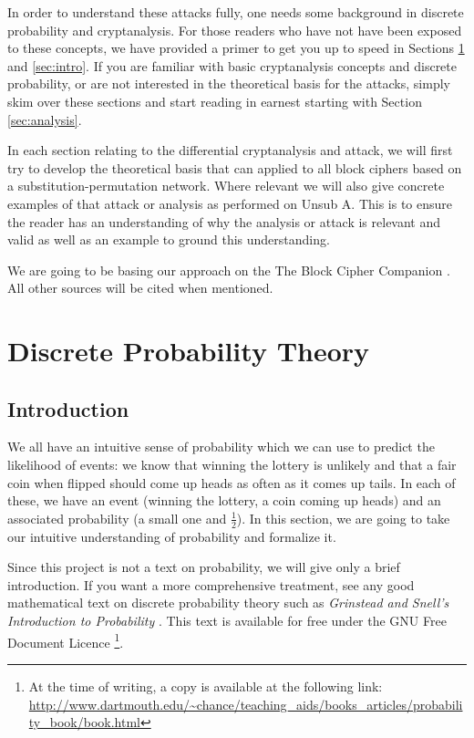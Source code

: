 \documentclass[12pt,a4paper]{article}
\begin{document}
In order to understand these attacks fully, one needs some background in
discrete probability and cryptanalysis. For those readers who have not have
been exposed to these concepts, we have provided a primer to get you up to
speed in Sections \ref{sec:probability} and \ref{sec:intro}. If you are familiar
with basic cryptanalysis concepts and discrete probability, or are not
interested in the theoretical basis for the attacks, simply skim over these
sections and start reading in earnest starting with Section \ref{sec:analysis}. 

In each section relating to the differential cryptanalysis and attack, we will
first try to develop the theoretical basis that can applied to all block
ciphers based on a substitution-permutation network. Where relevant we will
also give concrete examples of that attack or analysis as performed on Unsub A.
This is to ensure the reader has an understanding of why the analysis or attack
is relevant and valid as well as an example to ground this understanding. 

We are going to be basing our approach on the The Block Cipher Companion
\cite{BlockCipherCompanion}. All other sources will be cited when mentioned.

\newpage

\section{Discrete Probability Theory}
\label{sec:probability}
\subsection{Introduction}
We all have an intuitive sense of probability which we can use to predict the
likelihood of events: we know that winning the lottery is unlikely and that a
fair coin when flipped should come up heads as often as it comes up tails. In
each of these, we have an event (winning the lottery, a coin coming up heads)
and an associated probability (a small one and $\frac{1}{2}$). In this section,
we are going to take our intuitive understanding of probability and formalize
it.

Since this project is not a text on probability, we will give only a brief
introduction. If you want a more comprehensive treatment, see any good
mathematical text on discrete probability theory such as \textit{Grinstead and
Snell's Introduction to Probability} \cite{amsbook}. This text is available for
free under the GNU Free Document Licence \footnote{At the time of writing, a
copy is available at the following link:
\url{http://www.dartmouth.edu/~chance/teaching_aids/books_articles/probability_book/book.html}}.
\end{document}

